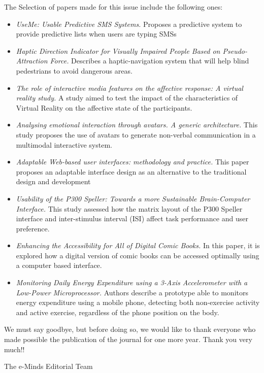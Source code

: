 The Selection of papers made for this issue include the following ones:
 \begin{itemize}
    \item \emph{UseMe: Usable Predictive SMS Systems.} Proposes a predictive system to provide predictive lists when users are typing SMSs
    \item \emph{Haptic Direction Indicator for Visually Impaired People Based on Pseudo-Attraction Force.} Describes a haptic-navigation system that will help blind pedestrians to avoid dangerous areas.
    \item \emph{The role of interactive media features on the affective response: A virtual reality study.} A study aimed to test the impact of the characteristics of Virtual Reality on the affective state of the participants.
    \item \emph{Analysing emotional interaction through avatars. A generic architecture.} This study proposes the use of avatars to generate non-verbal communication in a multimodal interactive system.
    \item \emph{Adaptable Web-based user interfaces: methodology and practice.} This paper proposes an adaptable interface design as an alternative to the traditional design and development
    \item \emph{Usability of the P300 Speller: Towards a more Sustainable Brain-Computer Interface.} This study assessed how the matrix layout of the P300 Speller interface and inter-stimulus interval (ISI) affect task performance and user preference.
    \item  \emph{Enhancing the Accessibility for All of Digital Comic Books.} In this paper, it is explored how a digital version of comic books can be accessed optimally using a computer based interface.
    \item  \emph{Monitoring Daily Energy Expenditure using a 3-Axis Accelerometer with a Low-Power Microprocessor.} Authors describe a prototype able to monitors energy expenditure using a mobile phone, detecting both non-exercise activity and active exercise, regardless of the phone position on the body.
 \end{itemize}

We must say goodbye, but before doing so, we would like to thank everyone who made possible the publication of the journal for one more year. Thank you very much!!

\vspace*{37mm}

\begin{flushright}
The  e-Minds Editorial Team
\end{flushright}

\bigskip


